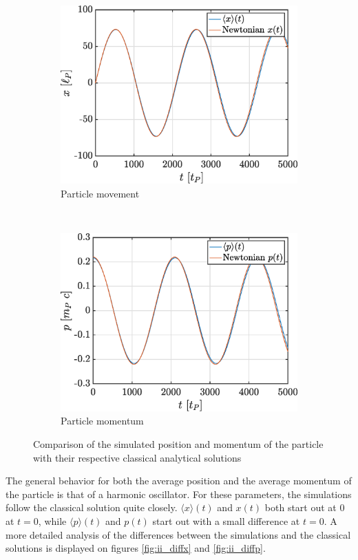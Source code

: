 \documentclass[a4paper,12pt,twoside]{article}
\begin{document}
\begin{figure}[h!]
\begin{subfigure}[t]{0.46\textwidth}
 \includegraphics[width=\textwidth]{graphs/ii_x.eps}
 \caption{Particle movement}
\end{subfigure}
~
\begin{subfigure}[t]{0.46\textwidth}
 \includegraphics[width=\textwidth]{graphs/ii_p.eps}
 \caption{Particle momentum}
\end{subfigure}
\caption{Comparison of the simulated position and momentum of the particle with their respective classical analytical solutions}
\label{fig:ii}
\end{figure}

The general behavior for both the average position and the average momentum of the particle is that of a harmonic oscillator. For these parameters, the simulations follow the classical solution quite closely. $\langle x \rangle (t)$ and $x(t)$ both start out at 0 at $t=0$, while $\langle p \rangle (t)$ and $p(t)$ start out with a small difference at $t=0$. A more detailed analysis of the differences between the simulations and the classical solutions is displayed on figures \ref{fig:ii_diffx} and \ref{fig:ii_diffp}.
\end{document}
